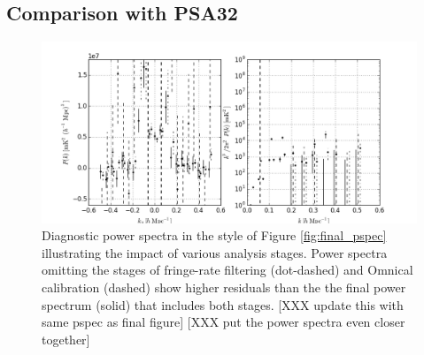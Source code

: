 \documentclass[twocolumn,numberedappendix]{emulateapj} \shorttitle{PSA64}
\begin{document}
\subsection{Comparison with PSA32}
%
%
%

\begin{figure}[t!]\centering
\includegraphics[width=2\columnwidth]{plots/pspec_comparison.png}
\caption{Diagnostic power spectra in the style of Figure \ref{fig:final_pspec}
illustrating the impact of various analysis stages.
Power spectra omitting the stages of fringe-rate filtering (dot-dashed) and 
Omnical calibration (dashed) show higher residuals than the the final power spectrum
(solid) that includes both stages.
[XXX update this with same pspec as final figure]
[XXX put the power spectra even closer together]
}\label{fig:pspec_comp}
\end{figure}
\end{document}
